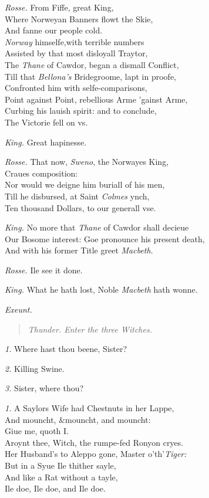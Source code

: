 \documentclass[12pt]{sides}
\newcommand{\StageDir}[1]{\begin{quote}\centering\em #1\end{quote}}
\newcommand{\elStageDir}[1]{\hfill\textit{#1}}
\newcommand{\dia}[1]{\hskip 15pt\textit{#1}\hskip 6pt}
\begin{document}
\begin{multicols}{2}
			\dia{Rosse.} From Fiffe, great King, \\ Where Norweyan Banners flowt the Skie, \\ And fanne our people cold. \\ \textit{Norway} himselfe,with terrible numbers \\ Assisted by that most disloyall Traytor, \\ The \textit{Thane} of Cawdor, began a dismall Conflict, \\ Till that \textit{Bellona's} Bridegroome, lapt in proofe, \\ Confronted him with selfe-comparisons, \\ Point against Point, rebellious Arme 'gainst Arme, \\ Curbing his lauish spirit: and to conclude, \\ The Victorie fell on vs.
			
			\dia{King.} Great hapinesse.
			
			\dia{Rosse.} That now, \textit{Sweno}, the Norwayes King, \\ Craues composition: \\ Nor would we deigne him buriall of his men, \\ Till he disbursed, at Saint \textit{Colmes} ynch, \\ Ten thousand Dollars, to our generall vse.
			
			\dia{King.} No more that \textit{Thane} of Cawdor shall decieue \\ Our Bosome interest: Goe pronounce his present death, \\ And with his former Title greet \textit{Macbeth}.
			
			\dia{Rosse.} Ile see it done.
			
			\dia{King.} What he hath lost, Noble \textit{Macbeth} hath wonne.
   
            \elStageDir{Exeunt.} \hspace{32pt}
			
			\StageDir{Thunder. Enter the three Witches.}
			
			\dia{1.} Where hast thou beene, Sister?
			
			\dia{2.} Killing Swine.
			
			\dia{3.} Sister, where thou?
			
			\dia{1.} A Saylors Wife had Chestnuts in her Lappe, \\ And mouncht, \&mouncht, and mouncht: \\ Giue me, quoth I. \\ Aroynt thee, Witch, the rumpe-fed Ronyon cryes. \\ Her Husband's to Aleppo gone, Master o'th'\textit{Tiger:} \\ But in a Syue Ile thither sayle, \\ And like a Rat without a tayle, \\ Ile doe, Ile doe, and Ile doe.
			

\end{multicols}
\end{document}
